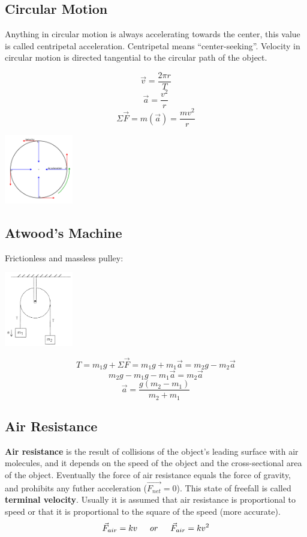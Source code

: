 \documentclass{article}
\begin{document}
\subsection{Circular Motion}
Anything in circular motion is always accelerating towards the center, this value is called centripetal acceleration. Centripetal means ``center-seeking''. Velocity in circular motion is directed tangential to the circular path of the object.

\begin{multicols}{2}
\[\vec{v}=\frac{2\pi r}{T}\]
\[\vec{a}=\frac{v^2}{r}\]
\[\Sigma\vec{F}=m(\vec{a})=\frac{mv^2}{r}\]
\columnbreak
\centerline{\includegraphics[width=3cm]{circularMotion.png}}
\end{multicols}

\subsection{Atwood's Machine}
Frictionless and massless pulley:

\begin{multicols}{2}
\centerline{\includegraphics[width=3cm]{atwood.png}}
\columnbreak
\[T=m_1g+\Sigma\vec{F}=m_1g+m_1\vec{a}=m_2g-m_2\vec{a}\]
\[m_2g-m_1g-m_1\vec{a}=m_2\vec{a}\]
\[\vec{a}=\frac{g(m_2-m_1)}{m_2+m_1}\]
\end{multicols}

\subsection{Air Resistance}
\textbf{Air resistance} is the result of collisions of the object's leading surface with air molecules, and it depends on the speed of the object and the cross-sectional area of the object. Eventually the force of air resistance equals the force of gravity, and prohibits any futher acceleration ($\vec{F_{net}}=0$). This state of freefall is called \textbf{terminal velocity}. Usually it is assumed that air resistance is proportional to speed or that it is proportional to the square of the speed (more accurate).
\[\vec{F}_{air}=kv \indent or \indent \vec{F}_{air}=kv^2\]
\end{document}
